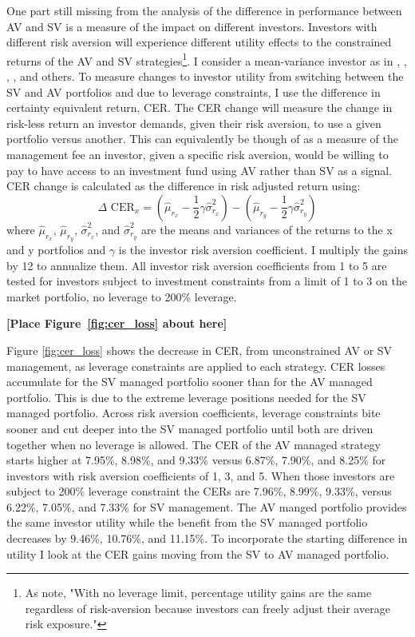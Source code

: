 One part still missing from the analysis of the difference in performance between AV and SV is a measure of the impact on different investors. Investors with different risk aversion will experience different utility effects to the constrained returns of the AV and SV strategies\footnote{As \citet{moreira_volatility-managed_2017} note, "With no leverage limit, percentage utility gains are the same regardless of risk-aversion because investors can freely adjust their average risk exposure."}. I consider a mean-variance investor as in \cite{Kandel1996}, \cite{Campbell2008}, \cite{Ferreira2011}, \cite{Rapach2016}, and others. To measure changes to investor utility from switching between the SV and AV portfolios and due to leverage constraints, I use the difference in certainty equivalent return, CER. The CER change will measure the change in risk-less return an investor demands, given their risk aversion, to use a given portfolio versus another. This can equivalently be though of as a measure of the management fee an investor, given a specific risk aversion, would be willing to pay to have access to an investment fund using AV rather than SV as a signal. CER change is calculated as the difference in risk adjusted return using:
\begin{equation}
\Delta \text{ CER}_{x} = \left(\hat \mu_{r_{x}} - \frac{1}{2}\gamma\hat \sigma^{2}_{r_{x}}\right) - \left(\hat \mu_{r_{y}} - \frac{1}{2}\gamma\hat \sigma^{2}_{r_{y}}\right)
\end{equation}
where $\hat \mu_{r_{x}}$, $\hat \mu_{r_{y}}$, $\hat \sigma^{2}_{r_{x}}$, and $\hat \sigma^{2}_{r_{y}}$ are the means and
variances of the returns to the x and y portfolios and $\gamma$ is the investor risk aversion coefficient. I multiply the gains by 12 to annualize them. All investor risk aversion coefficients from 1 to 5 are tested for investors subject to investment constraints from a limit of 1 to 3 on the market portfolio, no leverage to 200\% leverage.

\bigskip
\centerline{\bf [Place Figure~\ref{fig:cer_loss} about here]}
\bigskip

Figure \ref{fig:cer_loss} shows the decrease in CER, from unconstrained AV or SV management, as leverage constraints are applied to each strategy. CER losses accumulate for the SV managed portfolio sooner than for the AV managed portfolio. This is due to the extreme leverage positions needed for the SV managed portfolio. Across risk aversion coefficients, leverage constraints bite sooner and cut deeper into the SV managed portfolio until both are driven together when no leverage is allowed. The CER of the AV managed strategy starts higher at 7.95\%, 8.98\%, and 9.33\% versus 6.87\%, 7.90\%, and 8.25\% for investors with risk aversion coefficients of 1, 3, and 5. When those investors are subject to 200\% leverage constraint the CERs are 7.96\%, 8.99\%, 9.33\%, versus 6.22\%, 7.05\%, and 7.33\% for SV management. The AV manged portfolio provides the same investor utility while the benefit from the SV managed portfolio decreases by 9.46\%, 10.76\%, and 11.15\%. To incorporate the starting difference in utility I look at the CER gains moving from the SV to AV managed portfolio. 

